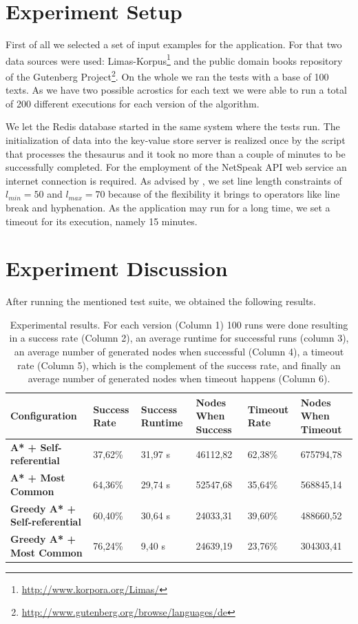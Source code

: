 \documentclass[11pt]{reportAlternative}
\begin{document}
\section{Experiment Setup}
First of all we selected a set of input examples for the application. For that two data sources were used: Limas-Korpus\footnote{\url{http://www.korpora.org/Limas/}} and the public domain books repository of the Gutenberg Project\footnote{\url{http://www.gutenberg.org/browse/languages/de}}. On the whole we ran the tests with a base of 100 texts. As we have two possible acrostics for each text we were able to run a total of 200 different executions for each version of the algorithm.

We let the Redis database started in the same system where the tests run. The initialization of data into the key-value store server is realized once by the script that processes the thesaurus and it took no more than a couple of minutes to be successfully completed. For the employment of the NetSpeak API web service an internet connection is required. As advised by \cite{Stein}, we set line length constraints of $l_{min} = 50$ and $l_{max} = 70$ because of the flexibility it brings to operators like line break and hyphenation. As the application may run for a long time, we set a timeout for its execution, namely 15 minutes.

\section{Experiment Discussion}
After running the mentioned test suite, we obtained the following results.

\begin{table}[h]
\centering
\begin{tabular}{p{3cm} | p{2cm} | p{2cm} | p{2.5cm} | p{2cm} | p{2.5cm}}
	\hline
	\textbf{Configuration} & \textbf{Success Rate} & \textbf{Success Runtime} & \textbf{Nodes When Success} & \textbf{Timeout Rate} & \textbf{Nodes When Timeout} \\ \hline
	\textbf{A* + Self-referential}	& 37,62\%	& 31,97 s	& 46112,82	& 62,38\%	& 675794,78 \\ \hline
	\textbf{A* + Most Common}		& 64,36\%	& 29,74 s	& 52547,68	& 35,64\%	& 568845,14 \\ \hline
	\textbf{Greedy A* + Self-referential}	& 60,40\%	& 30,64 s	& 24033,31	& 39,60\%	& 488660,52 \\ \hline
	\textbf{Greedy A* + Most Common}	& 76,24\%	& 9,40 s	& 24639,19	& 23,76\%	& 304303,41 \\ \hline
\end{tabular}
\label{tab:results}
\caption{Experimental results. For each version (Column 1) 100 runs were done resulting in a success rate (Column 2), an average runtime for successful runs (column 3), an average number of generated nodes when successful (Column 4), a timeout rate (Column 5), which is the complement of the success rate, and finally an average number of generated nodes when timeout happens (Column 6).}
\end{table}
\end{document}
